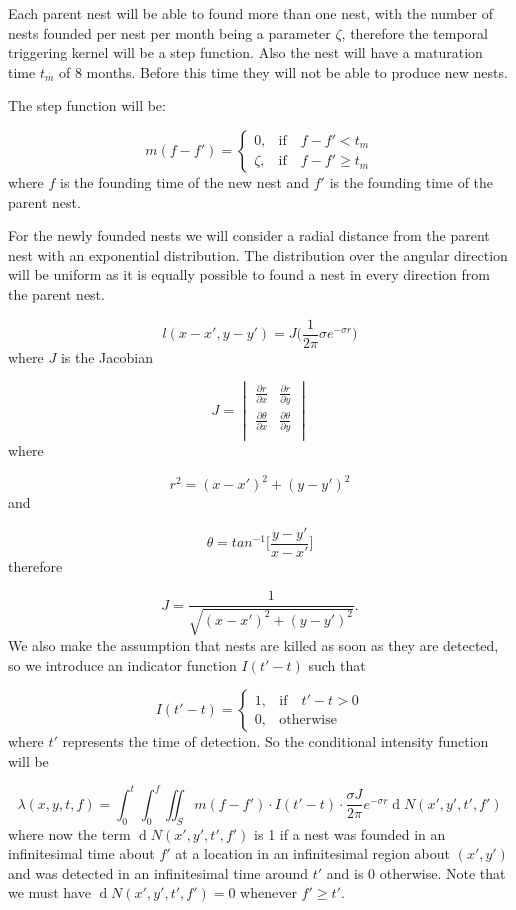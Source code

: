 \documentclass[11pt,a4paper]{article}
\renewcommand{\d}[1]{\ensuremath{\operatorname{d}\!{#1}}}
\begin{document}
Each parent nest will be able to found more than one nest, with the number of nests founded per nest per month being a parameter $\zeta$, therefore the temporal triggering kernel will be a step function. Also the nest will have a maturation time $t_m$ of 8 months. Before this time they will not be able to produce new nests. 

The step function will be:


\[
m (f - f') =
\begin{cases}
0, & \mbox{if} \quad f - f' < t_{m} \\
\zeta, & \mbox{if} \quad f - f' \geq t_{m}
\end{cases}
\]
where $f$ is the founding time of the new nest and $f'$ is the founding time of the parent nest.

For the newly founded nests we will consider a radial distance from the parent nest with an exponential distribution. The distribution over the angular direction will be uniform as it is equally possible to found a nest in every direction from the parent nest.

\begin{equation}
l(x - x', y - y')= J \bigg(\frac{1}{2 \pi} \sigma e^{- \sigma r}\bigg)
\end{equation}
where $J$ is the Jacobian

\[
J =  
\begin{vmatrix}
	\frac{\partial r}{\partial x} & \frac{\partial r}{\partial y} \\
	\frac{\partial \theta}{\partial x} & \frac{\partial \theta}{\partial y} \\
\end{vmatrix}
\]
where

\[
r^{2} = (x - x')^{2} + (y - y')^{2}
\]
and

\[
\theta = tan^{-1} \Bigg [\frac{y - y'}{x - x'} \Bigg ]
\]
therefore

\[
J = \frac{1}{\sqrt{(x - x')^{2} + (y - y')^{2}}}.
\]
We also make the assumption that nests are killed as soon as they are detected, so we introduce an indicator function $I(t' - t)$ such that

\[
I (t' - t) =
\begin{cases}
1, & \mbox{if} \quad t' -  t> 0 \\
0, & \mbox{otherwise}
\end{cases}
\]
where $t'$ represents the time of detection. So the conditional intensity function will be

\[
\lambda(x, y, t, f) = \int_{0}^{t} \int_{0}^{f} \iint_{S} m(f - f') \cdot I(t' - t)\cdot \frac{\sigma J }{2 \pi} e^{- \sigma r} \d N(x',y',t',f')
\]
where now the term $\d N(x',y',t',f')$ is 1 if a nest was founded in an infinitesimal time about $f'$ at a location in an infinitesimal region about $(x', y')$ and was detected in an infinitesimal time around $t'$ and is $0$ otherwise. Note that we must have $\d N(x',y',t',f')=0$ whenever $f' \geq t'$.
\end{document}
